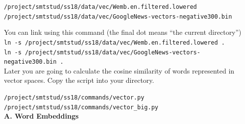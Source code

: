 \documentclass[12pt,fleqn]{article}
\begin{document}
\vspace{0.5cm}
\texttt{/project/smtstud/ss18/data/vec/Wemb.en.filtered.lowered} 
\texttt{/project/smtstud/ss18/data/vec/GoogleNews-vectors-negative300.bin} 

You can link using this command (the final dot means ``the current directory'')\\
\texttt{ln -s /project/smtstud/ss18/data/vec/Wemb.en.filtered.lowered .} \\ 
\texttt{ln -s /project/smtstud/ss18/data/vec/GoogleNews-vectors-negative300.bin .} \\


\vspace{0.5cm} 
Later you are going to calculate the cosine similarity of words represented in vector spaces. Copy the script into your directory. 

\vspace{0.5cm} 
\texttt{/project/smtstud/ss18/commands/vector.py} \\
\texttt{/project/smtstud/ss18/commands/vector\_big.py} \\

\vspace{0.5cm} 
\textbf{A. Word Embeddings} \\  
\end{document}
